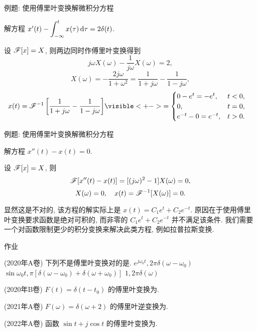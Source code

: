 \begin{frame}{例题: 使用傅里叶变换解微积分方程}
\beqskip{0pt}
\begin{example}
解方程 $x'(t)-\displaystyle\int_{-\infty}^t x(\tau)\,\mathrm{d} \tau=2\delta(t)$.
\end{example}
\begin{solution}
设 $\mathscr{F}[x]=X$, 则两边同时作傅里叶变换得到
\onslide<+->
\[j\omega X(\omega)-\frac1{j\omega}X(\omega)=2,\]
\onslide<+->
\[X(\omega)=-\frac{2j\omega}{1+\omega^2}=\frac1{1+j\omega}-\frac1{1-j\omega},\]
\onslide<+->
\begin{align*}
x(t)=\msf^{-1}\left[\frac1{1+j\omega}-\frac1{1-j\omega}\right]
&\visible<+->{=\begin{cases}
0-e^t=-e^t,&t<0,\\
0,&t=0,\\
e^{-t}-0=e^{-t},&t>0.
\end{cases}}
\end{align*}
\end{solution}
\vspace{-1pt}
\endgroup
\end{frame}


\begin{frame}{例题: 使用傅里叶变换解微积分方程}
\beqskip{8pt}
\begin{example}
解方程 $x''(t)-x(t)=0$.
\end{example}
\begin{solution}
设 $\mathscr{F}[x]=X$,
\onslide<+->
则
\[\mathscr{F}[x''(t)-x(t)]=[(j\omega)^2-1]X(\omega)=0,\]%
\onslide<+->
\vspace{-\baselineskip}
\[X(\omega)=0,\quad x(t)=\mathscr{F}^{-1}[X(\omega)]=0.\]
\end{solution}
\onslide<+->
显然这是不对的, 该方程的解实际上是 $x(t)=C_1e^t+C_2e^{-t}$.
\onslide<+->
原因在于使用傅里叶变换要求函数是绝对可积的, 而非零的 $C_1e^t+C_2e^{-t}$ 并不满足该条件.
\onslide<+->
我们需要一个对函数限制更少的积分变换来解决此类方程, 例如拉普拉斯变换.
\endgroup
\end{frame}


{
\homework
\begin{frame}[<*>]{作业}
	\begin{homeworks}
		\item(2020年A卷) 下列不是傅里叶变换对的是\fillbrace.
			{$e^{j\omega_0t},2\pi\delta(\omega-\omega_0)$}%
			{$\sin \omega_0t, \pi[\delta(\omega-\omega_0)+\delta(\omega+\omega_0)]$}%
			{$1,2\pi\delta(\omega)$}
		\item(2020年B卷) $F(t)=\delta(t-t_0)$ 的傅里叶变换为\fillblank{}.
		\item(2021年A卷) $F(\omega)=\delta(\omega+2)$ 的傅里叶逆变换为\fillblank{}.
		\item(2022年A卷) 函数 $\sin t+j\cos t$ 的傅里叶变换为\fillblank{}.
	\end{homeworks}
\end{frame}
}
